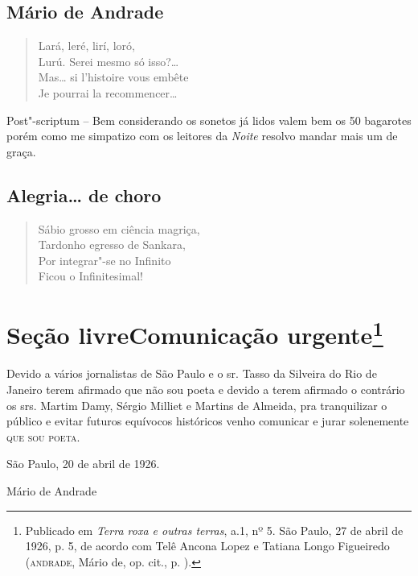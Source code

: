 \medskip
\subsection*{Mário de Andrade}

\begin{verse}
Lará, leré, lirí, loró,\\
Lurú. Serei mesmo só isso?\ldots{}\\
Mas\ldots{} si l'histoire vous embête\\
Je pourrai la recommencer\ldots{}
\end{verse}

\parbox{\textwidth}{
Post"-scriptum -- Bem considerando os sonetos já lidos valem bem os 50
bagarotes porém como me simpatizo com os leitores da \emph{Noite}
resolvo mandar mais um de graça.}


\bigskip
\subsection*{Alegria\ldots{} de choro}

\begin{verse}
Sábio grosso em ciência magriça,\\
Tardonho egresso de Sankara,\\
Por integrar"-se no Infinito\\
Ficou o Infinitesimal!
\end{verse}

\pagebreak
\section[Seção livre]{Seção livre\break Comunicação urgente\footnote[*]{Publicado em \emph{Terra roxa e
  outras terras}, a.1, nº 5. São Paulo, 27 de
  abril de 1926, p. 5, de acordo com Telê Ancona Lopez e Tatiana Longo
  Figueiredo (\textsc{andrade}, Mário de, op. cit., p. ).}}

\medskip

\begingroup\centering\parbox{165pt}{
Devido a vários jornalistas de São Paulo e o sr. Tasso da Silveira do
Rio de Janeiro terem afirmado que não sou poeta e devido a terem
afirmado o contrário os srs. Martim Damy, Sérgio Milliet e Martins de
Almeida, pra tranquilizar o público e evitar futuros equívocos
históricos venho comunicar e jurar solenemente \textsc{que sou poeta.}

\hfill{}São Paulo, 20 de abril de 1926.

\hfill{}Mário de Andrade}\endgroup

